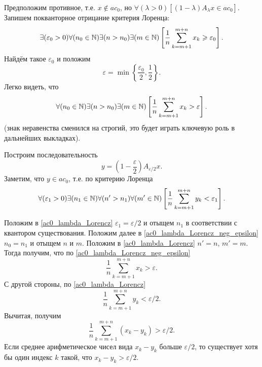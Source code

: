 Предположим противное, т.е. $x\notin ac_0$,
но $\forall(\lambda>0)[(1-\lambda)A_\lambda x \in ac_0]$.
Запишем покванторное отрицание критерия Лоренца:
\begin{equation}\label{ac0_lambda_Lorencz_neg}
	\exists(\varepsilon_0 > 0)
	\forall(n_0 \in \mathbb{N})
	\exists(n > n_0)
	\exists(m \in \mathbb{N})
	\left[
		\frac{1}{n}\sum_{k=m+1}^{m+n} x_k \geqslant \varepsilon_0
	\right]
	.
\end{equation}
Найдём такое $\varepsilon_0$ и положим
\begin{equation}
	\varepsilon = \min\left\{ \frac{\varepsilon_0}{2}, \frac{1}{2} \right\}
	.
\end{equation}
Легко видеть, что
\begin{equation}\label{ac0_lambda_Lorencz_neg_epsilon}
	\forall(n_0 \in \mathbb{N})
	\exists(n > n_0)
	\exists(m \in \mathbb{N})
	\left[
		\frac{1}{n}\sum_{k=m+1}^{m+n} x_k > \varepsilon
	\right]
	.
\end{equation}
(знак неравенства сменился на строгий, это будет играть ключевую роль в дальнейших выкладках).

Построим последовательность
\begin{equation}
	y = \left( 1 - \frac{\varepsilon}{2} \right) A_{\varepsilon/2} x
	.
\end{equation}
Заметим, что $y\in ac_0$, т.е. по критерию Лоренца
\begin{equation}\label{ac0_lambda_Lorencz}
	\forall(\varepsilon_1 > 0)
	\exists(n_1 \in \mathbb{N})
	\forall(n' > n_1)
	\forall(m' \in \mathbb{N})
	\left[
		\frac{1}{n}\sum_{k=m+1}^{m+n} y_k < \varepsilon_1
	\right]
	.
\end{equation}

Положим в \eqref{ac0_lambda_Lorencz} $\varepsilon_1 = \varepsilon/2$
и отыщем $n_1$ в соответствии с квантором существования.
Положим далее в \eqref{ac0_lambda_Lorencz_neg_epsilon}
$n_0 = n_1$ и отыщем $n$ и $m$.
Положим в \eqref{ac0_lambda_Lorencz} $n' = n$, $m' = m$.
Тогда получим, что по \eqref{ac0_lambda_Lorencz_neg_epsilon}
\begin{equation}
	\frac{1}{n}\sum_{k=m+1}^{m+n} x_k > \varepsilon
	.
\end{equation}
С другой стороны, по \eqref{ac0_lambda_Lorencz}
\begin{equation}
	\frac{1}{n}\sum_{k=m+1}^{m+n} y_k < \varepsilon/2
	.
\end{equation}
Вычитая, получим
\begin{equation}
	\frac{1}{n}\sum_{k=m+1}^{m+n} (x_k - y_k) > \varepsilon/2
	.
\end{equation}
Если среднее арифметическое чисел вида $x_k - y_k$ больше $\varepsilon/2$,
то существует хотя бы один индекс $k$ такой, что $x_k - y_k > \varepsilon/2$.

